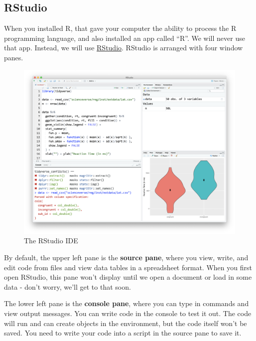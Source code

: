 \documentclass[
  oneside]{book}
\begin{document}
\subsection{RStudio}\label{rstudio_ide}

When you installed R, that gave your computer the ability to process the R programming language, and also installed an app called ``R''. We will never use that app. Instead, we will use \href{http://www.rstudio.com}{RStudio}. RStudio is arranged with four window panes{}.

\begin{figure}

{\centering \includegraphics[width=1\linewidth]{images/intro/rstudio} 

}

\caption{The RStudio IDE}\label{fig:img-rstudio}
\end{figure}

By default, the upper left pane is the \textbf{source pane}, where you view, write, and edit code from files and view data tables in a spreadsheet format. When you first open RStudio, this pane won't display until we open a document or load in some data - don't worry, we'll get to that soon.

The lower left pane is the \textbf{console pane}, where you can type in commands and view output messages. You can write code in the console to test it out. The code will run and can create objects in the environment, but the code itself won't be saved. You need to write your code into a script in the source pane to save it.
\end{document}
